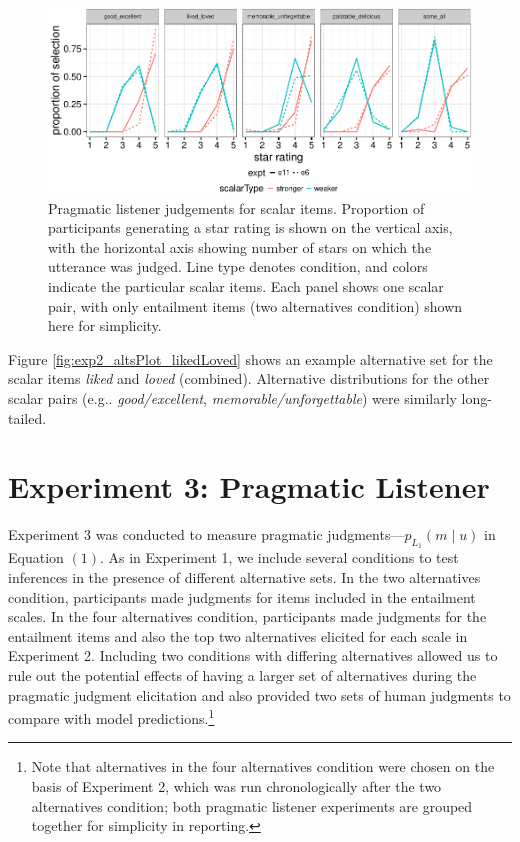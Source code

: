\documentclass[10pt, letterpaper]{article}
\newenvironment{CodeChunk}{}{}
\begin{document}
\begin{CodeChunk}
\begin{figure}[t]

{\centering \includegraphics{figs/exp2Plots-1} 

}

\caption[Pragmatic listener judgements for scalar items]{Pragmatic listener judgements for scalar items. Proportion of participants generating a star rating is shown on the vertical axis, with the horizontal axis showing number of stars on which the utterance was judged. Line type denotes condition, and colors indicate the particular scalar items. Each panel shows one scalar pair, with only entailment items (two alternatives condition) shown here for simplicity.}\label{fig:exp2Plots}
\end{figure}
\end{CodeChunk}

Figure \ref{fig:exp2_altsPlot_likedLoved} shows an example alternative
set for the scalar items \emph{liked} and \emph{loved} (combined).
Alternative distributions for the other scalar pairs (e.g..
\emph{good/excellent}, \emph{memorable/unforgettable}) were similarly
long-tailed.

\section{Experiment 3: Pragmatic
Listener}\label{experiment-3-pragmatic-listener}

Experiment 3 was conducted to measure pragmatic
judgments---\(p_{L_1}(m \mid u)\) in Equation \((1)\). As in Experiment
1, we include several conditions to test inferences in the presence of
different alternative sets. In the two alternatives condition,
participants made judgments for items included in the entailment scales.
In the four alternatives condition, participants made judgments for the
entailment items and also the top two alternatives elicited for each
scale in Experiment 2. Including two conditions with differing
alternatives allowed us to rule out the potential effects of having a
larger set of alternatives during the pragmatic judgment elicitation and
also provided two sets of human judgments to compare with model
predictions.\footnote{Note that alternatives in the four alternatives condition were chosen on the basis of Experiment 2, which was run chronologically after the two alternatives condition; both pragmatic listener experiments are grouped together for simplicity in reporting.}
\end{document}
